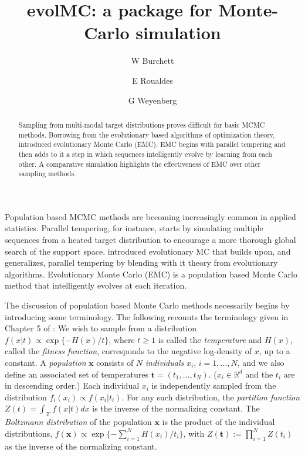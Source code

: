 \documentclass[12pt]{article}\usepackage[]{graphicx}\usepackage[]{color}
\title{evolMC: a package for Monte-Carlo simulation}
\author{W Burchett \and E Roualdes \and G Weyenberg}
\newcommand{\bx}{\mathbf x}
\newcommand{\bt}{\mathbf t}
\newcommand{\X}{\mathcal X}
\begin{document}
\maketitle
\doublespacing

\begin{abstract}
  Sampling from multi-modal target distributions proves difficult for basic MCMC methods.  Borrowing from the evolutionary based algorithms of optimization theory, \cite{Liang:2000} introduced evolutionary Monte Carlo (EMC).  EMC begins with parallel tempering and then adds to it a step in which sequences intelligently evolve by learning from each other.  A comparative simulation highlights the effectiveness of EMC over other sampling methods.
\end{abstract}

\vspace{1cm}
\label{sec:introduction}

Population based MCMC methods are becoming increasingly common in
applied statistics.  Parallel tempering, for instance, starts by
simulating multiple sequences from a heated target distribution to
encourage a more thorough global search of the support space.
\cite{Liang:2011} introduced evolutionary MC that builds upon, and
generalizes, parallel tempering by blending with it theory from
evolutionary algorithms. Evolutionary Monte Carlo (EMC) is a
population based Monte Carlo method that intelligently evolves at each
iteration.

The discussion of population based Monte Carlo methods necessarily
begins by introducing some terminology. The following recounts the
terminology given in Chapter 5 of \cite{Liang:2011}: We wish to sample
from a distribution $f(x|t) \propto \exp\{ -H(x)/t \}$, where $t\ge 1$
is called the \emph{temperature} and $H(x)$, called the \emph{fitness
  function}, corresponds to the negative log-density of $x$, up to a
constant. A \emph{population} $\mathbf{x}$ consists of $N$
\emph{individuals} $x_i$, $i = 1, \ldots, N$, and we also define an
associated set of temperatures $\bt = (t_1,\ldots,t_N)$. ($x_i \in
\mathbb{R}^d$ and the $t_i$ are in descending order.) Each individual
$x_i$ is independently sampled from the distribution $f_i(x_i) \propto
f(x_i|t_i)$.  For any such distribution, the \emph{partition function}
$Z(t)= \int_\X f(x|t) dx$ is the inverse of the normalizing
constant. The \emph{Boltzmann distribution} of the population $\bx$ is
the product of the individual distributions, $f(\bx) \propto \exp \{
-\sum_{i=1}^N H(x_i)/ t_i \}$, with $Z(\bt) := \prod_{i=1}^N Z(t_i)$
as the inverse of the normalizing constant.
\end{document}

